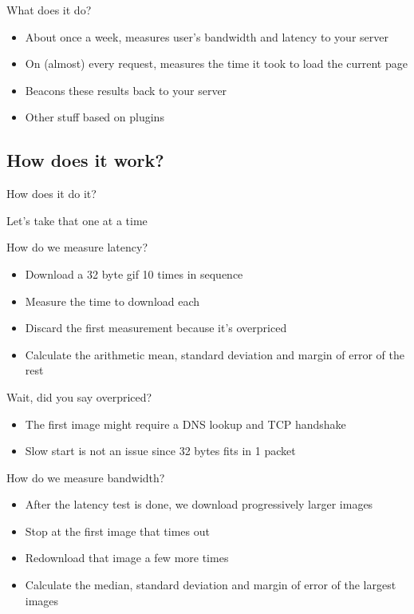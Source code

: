 \documentclass{beamer}
\begin{document}
\begin{frame}{What does it do?}
  \begin{itemize}
  \item About once a week, measures user's bandwidth and latency to your server
  \item On (almost) every request, measures the time it took to load the current page
  \item Beacons these results back to your server
  \item Other stuff based on plugins
  \end{itemize}
\end{frame}

\subsection{How does it work?}

\begin{frame}{How does it do it?}
  \begin{center}
  Let's take that one at a time
  \end{center}
\end{frame}

\begin{frame}{How do we measure latency?}
  \begin{itemize}
  \item Download a 32 byte gif 10 times in sequence
  \item Measure the time to download each
  \item Discard the first measurement because it's overpriced
  \item Calculate the arithmetic mean, standard deviation and margin of error of the rest
  \end{itemize}
\end{frame}

\begin{frame}{Wait, did you say overpriced?}
  \begin{itemize}
  \item The first image might require a DNS lookup and TCP handshake
  \item Slow start is not an issue since 32 bytes fits in 1 packet
  \end{itemize}
\end{frame}

\begin{frame}{How do we measure bandwidth?}
  \begin{itemize}
  \item After the latency test is done, we download progressively larger images
  \item Stop at the first image that times out
  \item Redownload that image a few more times
  \item Calculate the median, standard deviation and margin of error of the largest images
  \end{itemize}
\end{frame}
\end{document}
